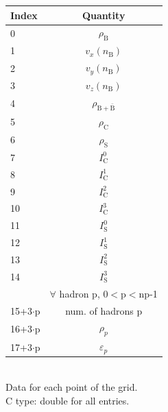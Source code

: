 \documentclass[12pt, a4paper]{article}
\begin{document}
\begin{minipage}{0.4\textwidth}
	\centering
	\begin{tabular}{|l | c |} 
		\hline
		\cellcolor{Yellow}Index & \cellcolor{Yellow} Quantity \\
		\hline
		\cellcolor{SpringGreen}0&\cellcolor{SpringGreen}$\rho_{\mathrm{B}}$\\
		\hline
		\cellcolor{LimeGreen}1&\cellcolor{LimeGreen}$v_x(n_{\mathrm{B}})$\\
		\hline
		\cellcolor{LimeGreen}2&\cellcolor{LimeGreen}$v_y(n_{\mathrm{B}})$\\
		\hline
		\cellcolor{LimeGreen}3&\cellcolor{LimeGreen}$v_z(n_{\mathrm{B}})$\\
		\hline
		\cellcolor{ForestGreen}4&\cellcolor{ForestGreen}$\rho_{\mathrm{B}+\mathrm{\bar{B}}}$\\
		\hline
		\cellcolor{SkyBlue}5&\cellcolor{SkyBlue}$\rho_{\mathrm{C}}$\\
		\hline
		\cellcolor{Turquoise}6&\cellcolor{Turquoise}$\rho_{\mathrm{S}}$\\
		\hline
		\cellcolor{Cerulean}7&\cellcolor{Cerulean}$I^0_{\mathrm{C}}$\\
		\hline
		\cellcolor{Cerulean}8&\cellcolor{Cerulean}$I^1_{\mathrm{C}}$\\
		\hline
		\cellcolor{Cerulean}9&\cellcolor{Cerulean}$I^2_{\mathrm{C}}$\\
		\hline
		\cellcolor{Cerulean}10&\cellcolor{Cerulean}$I^3_{\mathrm{C}}$\\
		\hline
		\cellcolor{Orchid}11&\cellcolor{Orchid}$I^0_{\mathrm{S}}$\\
		\hline
		\cellcolor{Orchid}12&\cellcolor{Orchid}$I^1_{\mathrm{S}}$\\
		\hline
		\cellcolor{Orchid}13&\cellcolor{Orchid}$I^2_{\mathrm{S}}$\\
		\hline
		\cellcolor{Orchid}14&\cellcolor{Orchid}$I^3_{\mathrm{S}}$\\
		\hline
		\cellcolor{Yellow}&\cellcolor{Yellow}$\forall$ hadron p, 0$<$p$<$np-1\\
		\cellcolor{Lavender}15+3$\cdot$p&\cellcolor{Lavender}num. of hadrons p\\
		\hline
		\cellcolor{Lavender}16+3$\cdot$p&\cellcolor{Lavender}$\rho_p$\\
		\hline
		\cellcolor{Lavender}17+3$\cdot$p&\cellcolor{Lavender}$\varepsilon_p$\\
		\hline		
	\end{tabular}\\
\vspace{1mm}
    \footnotesize{Data for each point of the grid.\\C type: double for all entries.}
    \vspace{5mm}
  \end{minipage}
\end{document}

